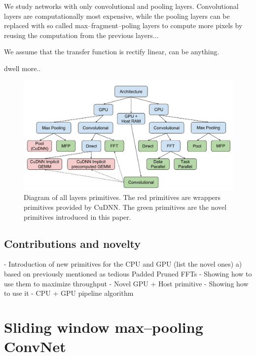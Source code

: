 \documentclass[conference]{IEEEtran}
\begin{document}
  We study networks with only convolutional and pooling layers.
  Convolutional layers are computationally most expensive, while the
  pooling layers can be replaced with so called max--fragment--poling
  layers to compute more pixels by reusing the computation from the
  previous layers...

  We assume that the transfer function is rectify linear, can be
  anything.

  dwell more..

  \begin{figure}
    \begin{center}
      \includegraphics[width=0.99\columnwidth]{fig/alllayersram.pdf}
    \end{center}
    \caption{Diagram of all layers primitives.  The red primitives are
      wrappers primitives provided by CuDNN.  The green primitives are
      the novel primitives introduced in this paper.}
    \label{fig:layers}
  \end{figure}

\subsection{Contributions and novelty}

  - Introduction of new primitives for the CPU and GPU (list the novel ones)
     a) based on previously mentioned as tedious Padded Pruned FFTs
  - Showing how to use them to maximize throughput
  - Novel GPU + Host primitive
  - Showing how to use it
  - CPU + GPU pipeline algorithm

\section{Sliding window max--pooling ConvNet}

  \label{sec:sliding-window}
\end{document}
